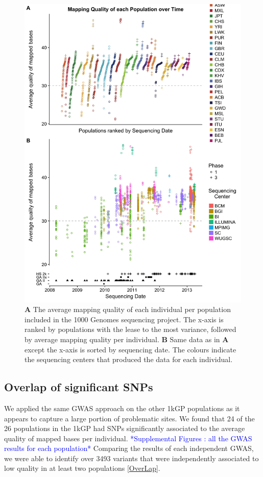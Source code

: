 \documentclass[9pt,lineno]{elife}
\newcommand{\todo}[1]{\textcolor{blue}{*#1*}}
\begin{document}
\begin{figure}
\includegraphics[width=\hsize,keepaspectratio]{MapQualOverTime.jpg}

\caption{\textbf{A} The average mapping quality of each individual per population included in the 1000 Genomes sequencing project. The x-axis is ranked by populations with the lease to the most variance, followed by average mapping quality per individual. \textbf{B} Same data as in \textbf{A} except the x-axis is sorted by sequencing date. The colours indicate the sequencing centers that produced the data for each individual.}
\label{MapQual}
\end{figure}

	\subsection{Overlap of significant SNPs}
We applied the same GWAS approach on the other 1kGP populations as it appears to capture a large portion of problematic sites. 
We found that 24 of the 26 populations in the 1kGP had SNPs significantly associated to the average quality of mapped bases per individual.
\todo{Supplemental Figures : all the GWAS results for each population}
Comparing the results of each independent GWAS, we were able to identify over 3493 variants that were independently associated to low quality in at least two populations  \ref{OverLap}. 
\end{document}

